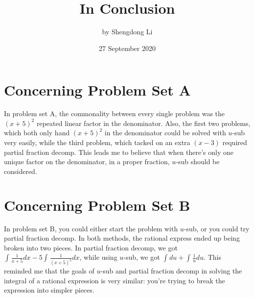 \documentclass[12pt]{article}
\begin{document}
\title{In Conclusion}
\author{by Shengdong Li}
\date{27 September 2020}
\maketitle

\section{Concerning Problem Set A}
In problem set A, the commonality between every single problem was the $\left(x+5\right)^{2}$ repeated linear factor in the denominator. Also, the first two problems, which both only hand $(x+5)^2$ in the denominator could be solved with $u$-sub very easily, while the third problem, which tacked on an extra $(x-3)$ required partial fraction decomp. This leads me to believe that when there's only one unique factor on the denominator, in a proper fraction, $u$-sub should be considered. 

\section{Concerning Problem Set B}
In problem set B, you could either start the problem with $u$-sub, or you could try partial fraction decomp. In both methods, the rational express ended up being broken into two pieces. In partial fraction decomp, we got $\int_{ }^{ }\frac{1}{x+5}dx-5\int_{ }^{ }\frac{1}{\left(x+5\right)^{2}}dx$, while using $u$-sub, we got $\int_{ }^{ }du+\int_{ }^{ }\frac{1}{u}du$. This reminded me that the goals of $u$-sub and partial fraction decomp in solving the integral of a rational expression is very similar: you're trying to break the expression into simpler pieces.
\end{document}
